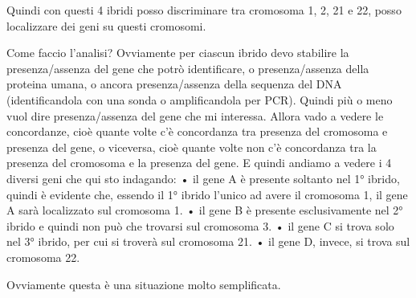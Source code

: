 \documentclass[11pt]{book}
\begin{document}
Quindi con questi 4 ibridi posso discriminare tra cromosoma 1, 2, 21 e 22, posso localizzare dei geni su questi cromosomi.

Come faccio l’analisi? 
Ovviamente per ciascun ibrido devo stabilire la presenza/assenza del gene che potrò identificare, o presenza/assenza della proteina umana, o ancora presenza/assenza della sequenza del DNA (identificandola con una sonda o amplificandola per PCR). Quindi più o meno vuol dire presenza/assenza del gene che mi interessa.
Allora vado a vedere le concordanze, cioè quante volte c’è concordanza tra presenza del cromosoma e presenza del gene, o viceversa, cioè quante volte non c’è concordanza tra la presenza del cromosoma e la presenza del gene. 
E quindi andiamo a vedere i 4 diversi geni che qui sto indagando:
    • il gene A è presente soltanto nel 1° ibrido, quindi è evidente che, essendo il 1° ibrido l’unico ad avere il cromosoma 1, il gene A sarà localizzato sul cromosoma 1.
    • il gene B è presente esclusivamente nel 2° ibrido e quindi non può che trovarsi sul cromosoma 3.
    • il gene C si trova solo nel 3° ibrido, per cui si troverà sul cromosoma 21.
    • il gene D, invece, si trova sul cromosoma 22. 

Ovviamente questa è una situazione molto semplificata. 
\end{document}

